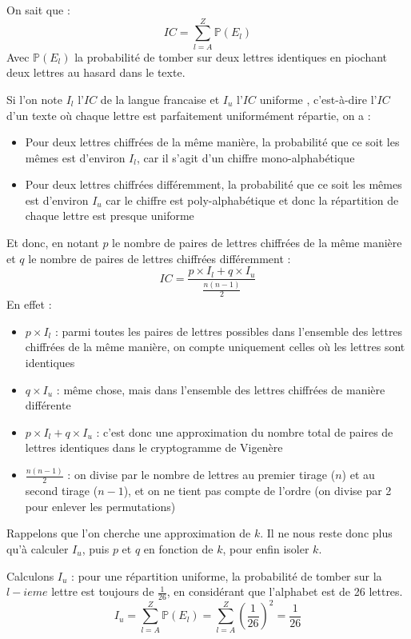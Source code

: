 \documentclass[a4paper, titlepage]{livret}
\begin{document}
On sait que :
\[IC = \sum_{l = A}^{Z} \mathbb{P}(E_{l})\]
Avec $\mathbb{P}(E_{l})$ la probabilité de tomber sur deux lettres identiques en piochant deux lettres au hasard dans le texte.

Si l'on note $I_{l}$ l'$IC$ de la langue francaise et $I_{u}$ l'$IC$ \og uniforme \fg{}, c'est-à-dire l'$IC$ d'un texte où chaque lettre est parfaitement uniformément répartie, on a :
\begin{itemize}
 \item Pour deux lettres chiffrées de la même manière, la probabilité que ce soit les mêmes est d'environ $I_{l}$, car il s'agit d'un chiffre mono-alphabétique
 \item Pour deux lettres chiffrées différemment, la probabilité que ce soit les mêmes est d'environ $I_{u}$ car le chiffre est poly-alphabétique et donc la répartition de chaque lettre est presque uniforme
\end{itemize}
Et donc, en notant $p$ le nombre de paires de lettres chiffrées de la même manière et $q$ le nombre de paires de lettres chiffrées différemment :
\[IC = \frac{p \times I_{l} + q \times I_{u}}{\frac{n(n-1)}{2}}\]
En effet :
\begin{itemize}
 \item $p \times I_{l}$ : parmi toutes les paires de lettres possibles dans l'ensemble des lettres chiffrées de la même manière, on compte uniquement celles où les lettres sont identiques 
 \item $q \times I_{u}$ : même chose, mais dans l'ensemble des lettres chiffrées de manière différente
 \item $p \times I_{l} + q \times I_{u}$ : c'est donc une approximation du nombre total de paires de lettres identiques dans le cryptogramme de Vigenère
 \item $\frac{n(n-1)}{2}$ : on divise par le nombre de lettres au premier tirage ($n$) et au second tirage ($n-1$), et on ne tient pas compte de l'ordre (on divise par 2 pour enlever les permutations)
\end{itemize}
Rappelons que l'on cherche une approximation de $k$. 
Il ne nous reste donc plus qu'à calculer $I_{u}$, puis $p$ et $q$ en fonction de $k$, pour enfin isoler $k$.

Calculons $I_{u}$ : 
pour une répartition uniforme, la probabilité de tomber sur la $l-ieme$ lettre est toujours de $\frac{1}{26}$, en considérant que l'alphabet est de 26 lettres.
\[I_{u} = \sum_{l = A}^{Z} \mathbb{P}(E_{l}) = \sum_{l = A}^{Z} (\frac{1}{26})^{2} = \frac{1}{26}\]
\end{document}
